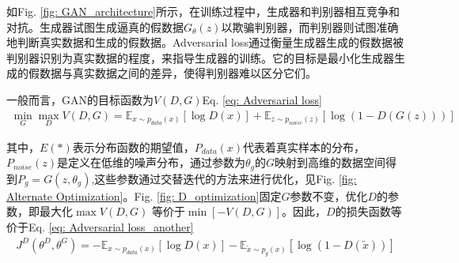 \documentclass[letterpaper,12pt]{article}
\begin{document}
	如Fig. \ref{fig: GAN_architecture}所示，在训练过程中，生成器和判别器相互竞争和对抗。生成器试图生成逼真的假数据$G_\theta{\left( z \right)}$以欺骗判别器，而判别器则试图准确地判断真实数据和生成的假数据。Adversarial loss通过衡量生成器生成的假数据被判别器识别为真实数据的程度，来指导生成器的训练。它的目标是最小化生成器生成的假数据与真实数据之间的差异，使得判别器难以区分它们。
	
	一般而言，GAN的目标函数为$V(D, G)$Eq. \ref{eq: Adversarial loss}
	\begin{equation}
		\begin{aligned}
			\min_G \max_D V\left( D, G \right) = \mathbb{E}_{x \sim p_{data}(x)}\left[ \log D(x) \right] + \mathbb{E}_{z \sim p_{noise}(z)}\left[ \log \left(1- D(G(z))\right) \right]
		\end{aligned}
		\label{eq: Adversarial loss_another}
	\end{equation}
	
	其中，$E(*)$表示分布函数的期望值，$P_{data}(x)$代表着真实样本的分布，$P_{noise}(z)$是定义在低维的噪声分布，通过参数为$\theta_{g}$的$G$映射到高维的数据空间得到$P_g=G(z,\theta_{g})$,这些参数通过交替迭代的方法来进行优化，见Fig. \ref{fig: Alternate Optimization}。Fig. \ref{fig: D_optimization}固定$G$参数不变，优化$D$的参数，即最大化$\max V\left( D, G \right)$ 等价于$\min \left[ - V(D,G) \right]$。因此，$D$的损失函数等价于Eq. \ref{eq: Adversarial loss_another}
	\begin{equation}
		\begin{aligned}
			J^{D} \left( \theta^{D}, \theta^{G} \right) = -\mathbb{E}_{x \sim p_{data}(x)}\left[ \log D(x) \right] - \mathbb{E}_{\tilde{x} \sim p_{g}(x)}\left[ \log \left(1- D(\tilde{x})\right) \right]
		\end{aligned}
		\label{eq: Adversarial loss}
	\end{equation}
	
\end{document}
